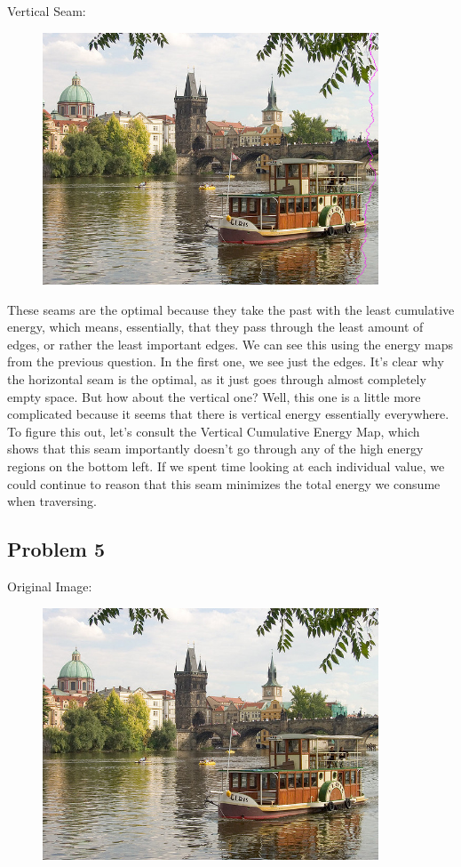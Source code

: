 \documentclass[12pt]{article}
\begin{document}
\noindent
Vertical Seam:
\begin{figure}[H]
  \includegraphics[width=100mm]{PS1_Q4_1.png}
\end{figure}

\noindent
These seams are the optimal because they take the past with the least cumulative energy, which means, essentially, that they pass through the least amount of edges, or rather the least important edges. We can see this using the energy maps from the previous question. In the first one, we see just the edges. It's clear why the horizontal seam is the optimal, as it just goes through almost completely empty space. But how about the vertical one? Well, this one is a little more complicated because it seems that there is vertical energy essentially everywhere. To figure this out, let's consult the Vertical Cumulative Energy Map, which shows that this seam importantly doesn't go through any of the high energy regions on the bottom left. If we spent time looking at each individual value, we could continue to reason that this seam minimizes the total energy we consume when traversing.

\newpage
\subsection*{Problem 5}
Original Image:
\begin{figure}[H]
  \includegraphics[width=100mm]{inputSeamCarvingPrague.jpg}
\end{figure}
\end{document}

